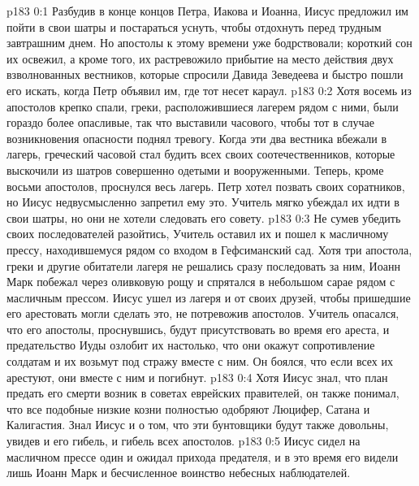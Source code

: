 \vs p183 0:1 Разбудив в конце концов Петра, Иакова и Иоанна, Иисус предложил им пойти в свои шатры и постараться уснуть, чтобы отдохнуть перед трудным завтрашним днем. Но апостолы к этому времени уже бодрствовали; короткий сон их освежил, а кроме того, их растревожило прибытие на место действия двух взволнованных вестников, которые спросили Давида Зеведеева и быстро пошли его искать, когда Петр объявил им, где тот несет караул.
\vs p183 0:2 Хотя восемь из апостолов крепко спали, греки, расположившиеся лагерем рядом с ними, были гораздо более опасливые, так что выставили часового, чтобы тот в случае возникновения опасности поднял тревогу. Когда эти два вестника вбежали в лагерь, греческий часовой стал будить всех своих соотечественников, которые выскочили из шатров совершенно одетыми и вооруженными. Теперь, кроме восьми апостолов, проснулся весь лагерь. Петр хотел позвать своих соратников, но Иисус недвусмысленно запретил ему это. Учитель мягко убеждал их идти в свои шатры, но они не хотели следовать его совету.
\vs p183 0:3 Не сумев убедить своих последователей разойтись, Учитель оставил их и пошел к масличному прессу, находившемуся рядом со входом в Гефсиманский сад. Хотя три апостола, греки и другие обитатели лагеря не решались сразу последовать за ним, Иоанн Марк побежал через оливковую рощу и спрятался в небольшом сарае рядом с масличным прессом. Иисус ушел из лагеря и от своих друзей, чтобы пришедшие его арестовать могли сделать это, не потревожив апостолов. Учитель опасался, что его апостолы, проснувшись, будут присутствовать во время его ареста, и предательство Иуды озлобит их настолько, что они окажут сопротивление солдатам и их возьмут под стражу вместе с ним. Он боялся, что если всех их арестуют, они вместе с ним и погибнут.
\vs p183 0:4 Хотя Иисус знал, что план предать его смерти возник в советах еврейских правителей, он также понимал, что все подобные низкие козни полностью одобряют Люцифер, Сатана и Калигастия. Знал Иисус и о том, что эти бунтовщики будут также довольны, увидев и его гибель, и гибель всех апостолов.
\vs p183 0:5 Иисус сидел на масличном прессе один и ожидал прихода предателя, и в это время его видели лишь Иоанн Марк и бесчисленное воинство небесных наблюдателей.
